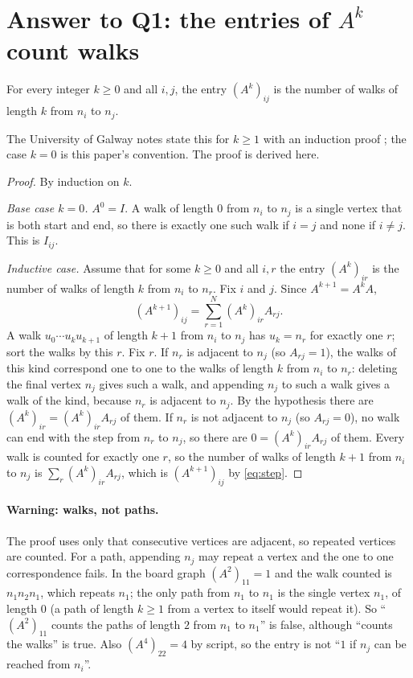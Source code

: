 \section{Answer to Q1: the entries of $A^k$ count walks}\label{sec:q1}

\begin{theorem}\label{thm:counting}
For every integer $k\ge 0$ and all $i,j$, the entry $(A^k)_{ij}$ is the number
of walks of length $k$ from $n_i$ to $n_j$.
\end{theorem}
The University of Galway notes state this for $k\ge 1$ with an induction
proof \cite[Theorem~1.1.3, p.~4]{galwaynotes}; the case $k=0$ is this paper's
convention. The proof is derived here.
\begin{proof}
By induction on $k$.

\emph{Base case $k=0$.} $A^0=I$. A walk of length $0$ from $n_i$ to $n_j$ is a
single vertex that is both start and end, so there is exactly one such walk
if $i=j$ and none if $i\ne j$. This is $I_{ij}$.

\emph{Inductive case.} Assume that for some $k\ge 0$ and all $i,r$ the entry
$(A^k)_{ir}$ is the number of walks of length $k$ from $n_i$ to $n_r$. Fix $i$
and $j$. Since $A^{k+1}=A^kA$,
\begin{equation}\label{eq:step}
(A^{k+1})_{ij}=\sum_{r=1}^{N}(A^k)_{ir}A_{rj}.
\end{equation}
A walk $u_0\cdots u_ku_{k+1}$ of length $k+1$ from $n_i$ to $n_j$ has
$u_k=n_r$ for exactly one $r$; sort the walks by this $r$. Fix $r$.
If $n_r$ is adjacent to $n_j$ (so $A_{rj}=1$), the walks of this kind
correspond one to one to the walks of length $k$ from $n_i$ to $n_r$: deleting
the final vertex $n_j$ gives such a walk, and appending $n_j$ to such a walk
gives a walk of the kind, because $n_r$ is adjacent to $n_j$. By the
hypothesis there are $(A^k)_{ir}=(A^k)_{ir}A_{rj}$ of them. If $n_r$ is not
adjacent to $n_j$ (so $A_{rj}=0$), no walk can end with the step from $n_r$ to
$n_j$, so there are $0=(A^k)_{ir}A_{rj}$ of them. Every walk is counted for
exactly one $r$, so the number of walks of length $k+1$ from $n_i$ to $n_j$ is
$\sum_r(A^k)_{ir}A_{rj}$, which is $(A^{k+1})_{ij}$ by \cref{eq:step}.
\end{proof}

\paragraph{Warning: walks, not paths.} The proof uses only that consecutive
vertices are adjacent, so repeated vertices are counted. For a path, appending
$n_j$ may repeat a vertex and the one to one correspondence fails. In the
board graph $(A^2)_{11}=1$ and the walk counted is $n_1n_2n_1$, which repeats
$n_1$; the only path from $n_1$ to $n_1$ is the single vertex $n_1$, of length
$0$ (a path of length $k\ge 1$ from a vertex to itself would repeat it). So
``$(A^2)_{11}$ counts the paths of length $2$ from $n_1$ to $n_1$'' is false,
although ``counts the walks'' is true. Also $(A^4)_{22}=4$ by script, so the entry is
not ``$1$ if $n_j$ can be reached from $n_i$''.

